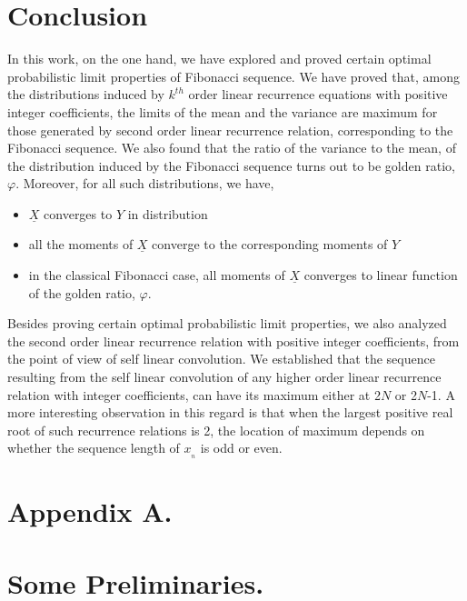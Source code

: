 \begin{multicols}{2}
\vspace{-.3cm}

\section{Conclusion}\label{section-20}
In this work, on the one hand, we have explored and proved certain optimal probabilistic limit properties of Fibonacci sequence. We have proved that, among the distributions induced by $k^{th}$ order linear recurrence equations with positive integer coefficients, the limits of the mean and the variance are maximum for those generated by second order linear recurrence relation, corresponding to the Fibonacci sequence. We also found that the ratio of the variance to the mean, of the distribution induced by the Fibonacci sequence turns out to be golden ratio, $\varphi$. Moreover, for all such distributions, we have,

\vspace{-.3cm}

\begin{itemize}
\item $\underline{X}$ converges to $Y$ in distribution
\item all the moments of $\underline{X}$ converge to the corresponding moments of $Y$
\item in the classical Fibonacci case, all moments of $\underline{X}$ converges to linear function of the golden ratio, $\varphi$.
\end{itemize}

\vspace{-.3cm}

Besides proving certain optimal probabilistic limit properties, we also analyzed the second order linear recurrence relation with positive integer coefficients, from the point of view of self linear convolution. We established that the sequence resulting from the self linear convolution of any higher order linear recurrence relation with integer coefficients, can have its maximum either at 2$N$ or 2$N$-1. A more interesting observation in this regard is that when the largest positive real root of such recurrence relations is 2, the location of maximum depends on whether the sequence length of $x_{_n}$ is odd or even.

\section*{Appendix A.\label{section-app-a}}
\section*{Some Preliminaries.}\label{app-1}


\end{multicols}
